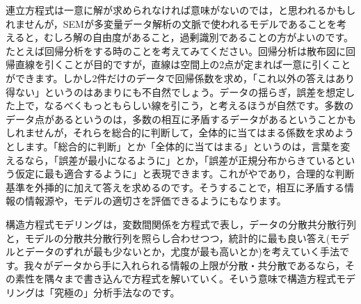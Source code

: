 \documentclass{ltjsbook}
\begin{document}
連立方程式は一意に解が求められなければ意味がないのでは，と思われるかもしれませんが，SEMが多変量データ解析の文脈で使われるモデルであることを考えると，むしろ解の自由度があること，過剰識別であることの方がよいのです\parencite{MurakamiRYU}。たとえば回帰分析をする時のことを考えてみてください。回帰分析は散布図に回帰直線を引くことが目的ですが，直線は空間上の2点が定まれば一意に引くことができます。しかし2件だけのデータで回帰係数を求め，「これ以外の答えはあり得ない」というのはあまりにも不自然でしょう。データの揺らぎ，誤差を想定した上で，なるべくもっともらしい線を引こう，と考えるほうが自然です。多数のデータ点があるというのは，多数の相互に矛盾するデータがあるということかもしれませんが，それらを総合的に判断して，全体的に当てはまる係数を求めようとします。「総合的に判断」とか「全体的に当てはまる」というのは，言葉を変えるなら，「誤差が最小になるように」とか，「誤差が正規分布からきているという仮定に最も適合するように」と表現できます。これがやであり，合理的な判断基準を外挿的に加えて答えを求めるのです。そうすることで，相互に矛盾する情報の情報源や，モデルの適切さを評価できるようにもなります。

構造方程式モデリングは，変数間関係を方程式で表し，データの分散共分散行列と，モデルの分散共分散行列を照らし合わせつつ，統計的に最も良い答え(モデルとデータのずれが最も少ないとか，尤度が最も高いとか)を考えていく手法です。我々がデータから手に入れられる情報の上限が分散・共分散であるなら，その素性を隅々まで書き込んで方程式を解いていく。そいう意味で構造方程式モデリングは「究極の」分析手法なのです。
\end{document}
